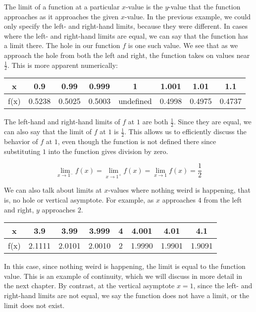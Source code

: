 The limit of a function at a particular $ x $-value is the $ y $-value that the 
function approaches as it approaches the given $ x $-value. In the previous 
example, we could only specify the left- and right-hand limits, because they were 
different. In cases where the left- and right-hand limits are equal, we can say 
that the function has a limit there. The hole in our function $ f $ is one such 
value. We see that as we approach the hole from both the left and right, the 
function takes on values near $\frac{1}{2}$. This is more apparent numerically:


\begin{center}
\begin{tabular}{ |c|c|c|c|c|c|c|c| } 
 \hline
 x & 0.9 & 0.99 & 0.999 & 1 & 1.001 & 1.01 & 1.1 \\ 
 \hline
 f(x) & 0.5238 & 0.5025 & 0.5003 & undefined & 0.4998 & 0.4975 & 0.4737 \\ 
 \hline
\end{tabular}
\end{center}

The left-hand and right-hand limits of $ f $ at $ 1 $ are both $\frac{1}{2}$. Since 
they are equal, we can also say that the limit of $ f $ at $ 1 $ is $\frac{1}{2}$. 
This allows us to efficiently discuss the behavior of $ f $ at $ 1 $, even though 
the function is not defined there since substituting $ 1 $ into the function gives 
division by zero.

$$ \lim_{x \rightarrow 1^-} f(x) = \lim_{x \rightarrow 1^+} f(x) = \lim_{x 
\rightarrow 1} f(x) = \frac{1}{2} $$

We can also talk about limits at $x$-values where nothing weird is happening, that 
is, no hole or vertical asymptote. For example, as $x$ approaches $4$ from the left 
and right, $y$ approaches $2$.

\begin{center}
\begin{tabular}{ |c|c|c|c|c|c|c|c| } 
 \hline
 x & 3.9 & 3.99 & 3.999 & 4 & 4.001 & 4.01 & 4.1 \\ 
 \hline
 f(x) & 2.1111 & 2.0101 & 2.0010 & 2 & 1.9990 & 1.9901 & 1.9091 \\ 
 \hline
\end{tabular}
\end{center}

In this case, since nothing weird is happening, the limit is equal to the function 
value. This is an example of continuity, which we will discuss in more detail in 
the next chapter. By contrast, at the vertical asymptote $ x = 1 $, since the left- 
and right-hand limits are not equal, we say the function does not have a limit, or 
the limit does not exist.

